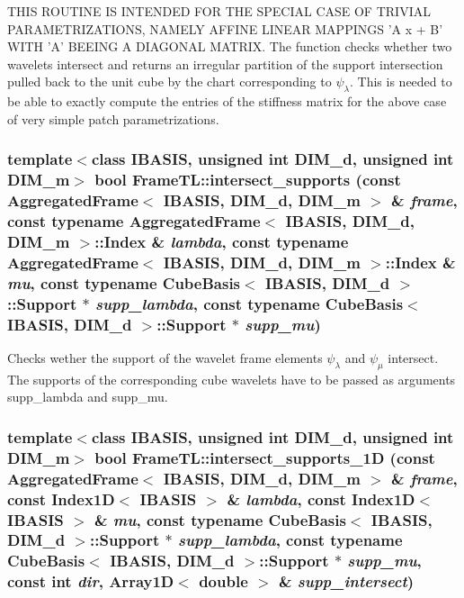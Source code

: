 THIS ROUTINE IS INTENDED FOR THE SPECIAL CASE OF TRIVIAL PARAMETRIZATIONS, NAMELY AFFINE LINEAR MAPPINGS 'A x + B' WITH 'A' BEEING A DIAGONAL MATRIX. The function checks whether two wavelets intersect and returns an irregular partition of the support intersection pulled back to the unit cube by the chart corresponding to $\psi_\lambda$. This is needed to be able to exactly compute the entries of the stiffness matrix for the above case of very simple patch parametrizations. \hypertarget{namespaceFrameTL_6d6670ec9613c9cf6ac3511a4b623429}{
\subsubsection[intersect\_\-supports]{\setlength{\rightskip}{0pt plus 5cm}template$<$class IBASIS, unsigned int DIM\_\-d, unsigned int DIM\_\-m$>$ bool FrameTL::intersect\_\-supports (const AggregatedFrame$<$ IBASIS, DIM\_\-d, DIM\_\-m $>$ \& {\em frame}, \/  const typename AggregatedFrame$<$ IBASIS, DIM\_\-d, DIM\_\-m $>$::Index \& {\em lambda}, \/  const typename AggregatedFrame$<$ IBASIS, DIM\_\-d, DIM\_\-m $>$::Index \& {\em mu}, \/  const typename CubeBasis$<$ IBASIS, DIM\_\-d $>$::Support $\ast$ {\em supp\_\-lambda}, \/  const typename CubeBasis$<$ IBASIS, DIM\_\-d $>$::Support $\ast$ {\em supp\_\-mu})}}
\label{namespaceFrameTL_6d6670ec9613c9cf6ac3511a4b623429}


Checks wether the support of the wavelet frame elements $\psi_\lambda$ and $\psi_\mu$ intersect. The supports of the corresponding cube wavelets have to be passed as arguments supp\_\-lambda and supp\_\-mu. \hypertarget{namespaceFrameTL_02c30f3ec04242a2445af8e588bae6b2}{
\subsubsection[intersect\_\-supports\_\-1D]{\setlength{\rightskip}{0pt plus 5cm}template$<$class IBASIS, unsigned int DIM\_\-d, unsigned int DIM\_\-m$>$ bool FrameTL::intersect\_\-supports\_\-1D (const AggregatedFrame$<$ IBASIS, DIM\_\-d, DIM\_\-m $>$ \& {\em frame}, \/  const Index1D$<$ IBASIS $>$ \& {\em lambda}, \/  const Index1D$<$ IBASIS $>$ \& {\em mu}, \/  const typename CubeBasis$<$ IBASIS, DIM\_\-d $>$::Support $\ast$ {\em supp\_\-lambda}, \/  const typename CubeBasis$<$ IBASIS, DIM\_\-d $>$::Support $\ast$ {\em supp\_\-mu}, \/  const int {\em dir}, \/  Array1D$<$ double $>$ \& {\em supp\_\-intersect})}}
\label{namespaceFrameTL_02c30f3ec04242a2445af8e588bae6b2}



